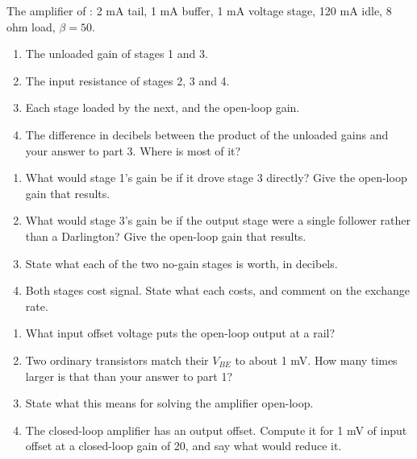 \label{c10:ex:3}
The amplifier of : 2 mA tail, 1 mA buffer, 1 mA voltage stage, 120 mA idle, 8 ohm load, $\beta = 50$.

\begin{enumerate}
  \item The unloaded gain of stages 1 and 3.
  \item The input resistance of stages 2, 3 and 4.
  \item Each stage loaded by the next, and the open-loop gain.
  \item The difference in decibels between the product of the unloaded gains and your answer to part 3. Where is most of it?
\end{enumerate}

\label{c10:ex:4}
\begin{enumerate}
  \item What would stage 1's gain be if it drove stage 3 directly? Give the open-loop gain that results.
  \item What would stage 3's gain be if the output stage were a single follower rather than a Darlington? Give the open-loop gain that results.
  \item State what each of the two no-gain stages is worth, in decibels.
  \item Both stages cost signal. State what each costs, and comment on the exchange rate.
\end{enumerate}

\label{c10:ex:5}
\begin{enumerate}
  \item What input offset voltage puts the open-loop output at a rail?
  \item Two ordinary transistors match their $V_{BE}$ to about 1 mV. How many times larger is that than your answer to part 1?
  \item State what this means for solving the amplifier open-loop.
  \item The closed-loop amplifier has an output offset. Compute it for 1 mV of input offset at a closed-loop gain of 20, and say what would reduce it.
\end{enumerate}

